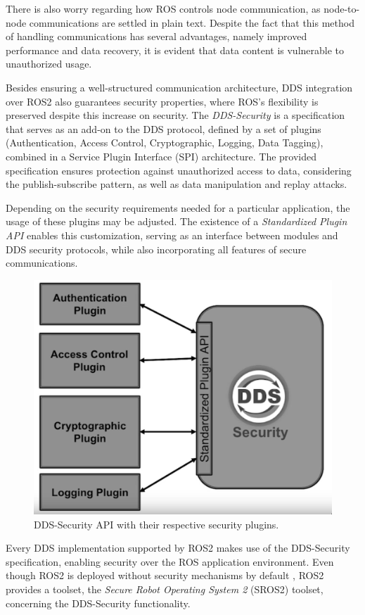 There is also worry regarding how ROS controls node communication, as node-to-node communications are settled in plain text. Despite the fact that this method of handling communications has several advantages, namely improved performance and data recovery, it is evident that data content is vulnerable to unauthorized usage.

Besides ensuring a well-structured communication architecture, DDS integration over ROS2 also guarantees security properties, where ROS's flexibility is preserved despite this increase on security. The \textit{DDS-Security} \cite{dds-s} is a specification that serves as an add-on to the DDS protocol, defined by a set of plugins (Authentication, Access Control, Cryptographic, Logging, Data Tagging), combined in a Service Plugin Interface (SPI) architecture. The provided specification ensures protection against unauthorized access to data, considering the publish-subscribe pattern, as well as data manipulation and replay attacks. \cite{8442103, ros-dds-integration}

Depending on the security requirements needed for a particular application, the usage of these plugins  may be adjusted. The existence of a \textit{Standardized Plugin API} enables this customization, serving as an interface between modules and DDS security protocols, while also incorporating all features of secure communications. 

\begin{figure}[H]
    \centering
    \includegraphics[width=0.5\linewidth]{images/dds-security.png}
    \caption{DDS-Security API with their respective security plugins.}
    \label{fig:dds-security}
\end{figure}

Every DDS implementation supported by ROS2 makes use of the DDS-Security specification, enabling security over the ROS application environment. Even though ROS2 is deployed without security mechanisms by default \cite{ros-dds-integration}, ROS2 provides a toolset, the \textit{Secure Robot Operating System 2} (SROS2) toolset, concerning the DDS-Security functionality.

